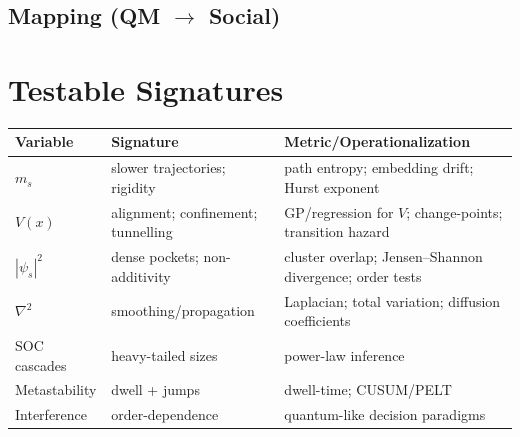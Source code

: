 \documentclass[sn-basic]{sn-jnl}
\begin{document}
\subsection{Mapping (QM $\to$ Social)}
\begin{table}[t]
\centering
\small
{}
\caption{Structural mapping from quantum formalism to socio--symbolic dynamics.}
\label{tab:mapping}
\end{table}

\section{Testable Signatures}\label{sec:signatures}
\begin{center}
\begin{tabular}{lll}
\toprule
Variable & Signature & Metric/Operationalization\\
\midrule
\(m_s\) & slower trajectories; rigidity & path entropy; embedding drift; Hurst exponent\\
\(V(x)\) & alignment; confinement; tunnelling & GP/regression for \(V\); change-points; transition hazard\\
\(|\psi_s|^2\) & dense pockets; non-additivity & cluster overlap; Jensen--Shannon divergence; order tests\\
\(\nabla^2\) & smoothing/propagation & Laplacian; total variation; diffusion coefficients\\
SOC cascades & heavy-tailed sizes & power-law inference \citep{ClausetShaliziNewman2009,StumpfPorter2012,Alstott2014}\\
Metastability & dwell + jumps & dwell-time; CUSUM/PELT\\
Interference & order-dependence & quantum-like decision paradigms \citep{BusemeyerBruza2012,HavenKhrennikov2013}\\
\bottomrule
\end{tabular}
\end{center}
\end{document}
